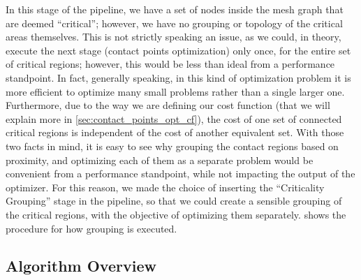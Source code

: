In this stage of the pipeline, we have a set of nodes inside the mesh graph that are deemed
``critical''; however, we have no grouping or topology of the critical areas themselves.
This is not strictly speaking an issue, as we could, in theory, execute the next stage (contact
points optimization) only once, for the entire set of critical regions; however, this would 
be less than ideal from a performance standpoint. In fact, generally speaking, in this kind of 
optimization problem it is more efficient to optimize many small problems rather than
a single larger one. Furthermore, due to the way we are defining our cost function (that we will
explain more in \cref{sec:contact_points_opt_cf}), the cost of one set
of connected critical regions is independent of the cost of another equivalent set.
With those two facts in mind, it is easy to see why grouping the contact regions
based on proximity, and optimizing each of them as a separate problem would be convenient
from a performance standpoint, while not impacting the output of the optimizer.
For this reason, we made the choice of inserting the ``Criticality Grouping'' stage
in the pipeline, so that we could create a sensible grouping of the critical regions,
with the objective of optimizing them separately.
 shows the procedure for how grouping is executed.

\subsection{Algorithm Overview}

